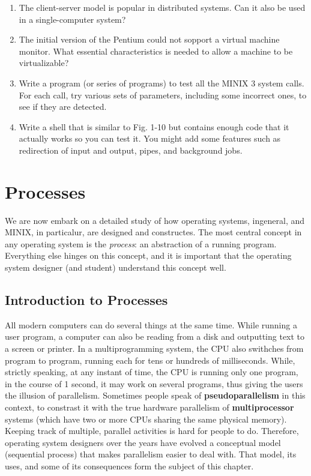 \documentclass{book}
\newcommand {\kw}  [1] {\textbf{#1}}
\newcommand {\sys} [1] {\textsl{#1}}
\begin{document}
\begin{enumerate}
\item The client-server model is popular in distributed systems.
      Can it also be used in a single-computer system?
\item The initial version of the Pentium could not sopport a virtual machine monitor.
      What essential characteristics is needed to allow a machine to be virtualizable?
\item Write a program (or series of programs) to test all the MINIX 3 system calls.
      For each call, try various sets of parameters, including some incorrect ones, to see if they are detected.
\item Write a shell that is similar to Fig. 1-10 but contains enough code that it actually works so you can test it.
      You might add some features such as redirection of input and output, pipes, and background jobs.
\end{enumerate}


\chapter{Processes}
We are now embark on a detailed study of how operating systems, ingeneral, and MINIX, in particalur, are designed and constructes.
The most central concept in any operating system is the \sys{process}: an abstraction of a running program.
Everything else hinges on this concept, and it is important that the operating system designer (and student) understand this concept well.

\section{Introduction to Processes}
All modern computers can do several things at the same time.
While running a user program, a computer can also be reading from a disk and outputting text to a screen or printer.
In a multiprogramming system, the CPU also swithches from program to program, 
running each for tens or hundreds of milliseconds.
While, strictly speaking, at any instant of time, the CPU is running only one program, 
in the course of 1 second, it may work on several programs, thus giving the users the illusion of parallelism.
Sometimes people speak of \kw{pseudoparallelism} in this context, 
to constrast it with the true hardware parallelism of \kw{multiprocessor} systems (which have two or more CPUs sharing the same physical memory).
Keeping track of multiple, parallel activities is hard for people to do.
Therefore, operating system designers over the years have evolved a conceptual model (sequential process) 
that makes parallelism easier to deal with.
That model, its uses, and some of its consequences form the subject of this chapter.
\end{document}
